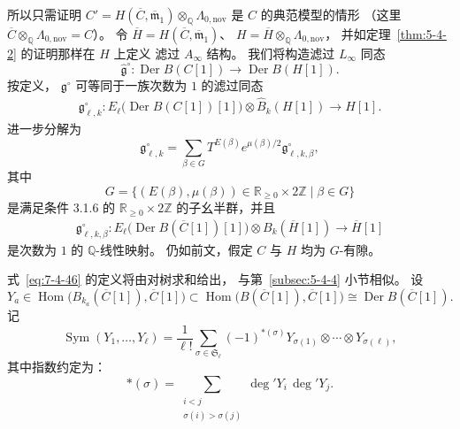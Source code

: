 所以只需证明
$C'=H(\overline C,\overline{\mathfrak m}_1)
\otimes_{\mathbb Q}
\Lambda_{0,\mathrm{nov}}$
是 $C$ 的典范模型的情形
（这里
$\overline C\otimes_{\mathbb Q}
\Lambda_{0,\mathrm{nov}}=C$）。
令
$\overline H
=H(\overline C,\overline{\mathfrak m}_1)$、
$H=\overline H\otimes_{\mathbb Q}
\Lambda_{0,\mathrm{nov}}$，
并如定理~\ref{thm:5-4-2}
的证明那样在 $H$ 上定义
滤过 $A_\infty$ 结构。
我们将构造滤过 $L_\infty$ 同态
\begin{equation}
\widehat{\mathfrak g}^{\circ}:
\operatorname{Der}B(C[1])
\longrightarrow
\operatorname{Der}B(H[1]).
\tag{7.4.43}\label{eq:7-4-43}
\end{equation}
按定义，
$\mathfrak g^{\circ}$
可等同于一族次数为 $1$
的滤过同态
\begin{equation}
\begin{aligned}
\mathfrak g^{\circ}_{\ell,k}:
E_\ell\bigl(
\operatorname{Der}B(C[1])[1]
\bigr)
\otimes
\widehat B_k(H[1])
\longrightarrow H[1].
\end{aligned}
\tag{7.4.44}\label{eq:7-4-44}
\end{equation}
进一步分解为
\[
\mathfrak g^{\circ}_{\ell,k}
=\sum_{\beta\in G}
T^{E(\beta)}e^{\mu(\beta)/2}
\mathfrak g^{\circ}_{\ell,k,\beta},
\]
其中
\[
G=\bigl\{
(E(\beta),\mu(\beta))
\in\mathbb R_{\ge0}\times2\mathbb Z
\mid\beta\in G
\bigr\}
\]
是满足条件 3.1.6 的
$\mathbb R_{\ge0}\times2\mathbb Z$
的子幺半群，并且
\begin{equation}
\begin{aligned}
\mathfrak g^{\circ}_{\ell,k,\beta}:
E_\ell\bigl(
\operatorname{Der}B(\overline C[1])[1]
\bigr)
\otimes
B_k(\overline H[1])
\longrightarrow\overline H[1]
\end{aligned}
\tag{7.4.45}\label{eq:7-4-45}
\end{equation}
是次数为 $1$ 的
$\mathbb Q$-线性映射。
仍如前文，假定 $C$ 与 $H$
均为 $G$-有隙。

式~\eqref{eq:7-4-46}
的定义将由对树求和给出，
与第~\ref{subsec:5-4-4} 小节相似。
设
\[
Y_a\in
\operatorname{Hom}
\bigl(B_{k_a}(\overline C[1]),
\overline C[1]\bigr)
\subset
\operatorname{Hom}
\bigl(B(\overline C[1]),
\overline C[1]\bigr)
\cong
\operatorname{Der}B(\overline C[1]).
\]
记
\begin{equation}
\operatorname{Sym}(Y_1,\ldots,Y_\ell)
=\frac1{\ell!}
\sum_{\sigma\in\mathfrak S_\ell}
(-1)^{\ast(\sigma)}
Y_{\sigma(1)}\otimes\cdots\otimes
Y_{\sigma(\ell)},
\tag{7.4.46}\label{eq:7-4-46}
\end{equation}
其中指数约定为：
\[
\ast(\sigma)
=\sum_{\substack{i<j\\\sigma(i)>\sigma(j)}}
\deg'Y_i\,\deg'Y_j.
\]
